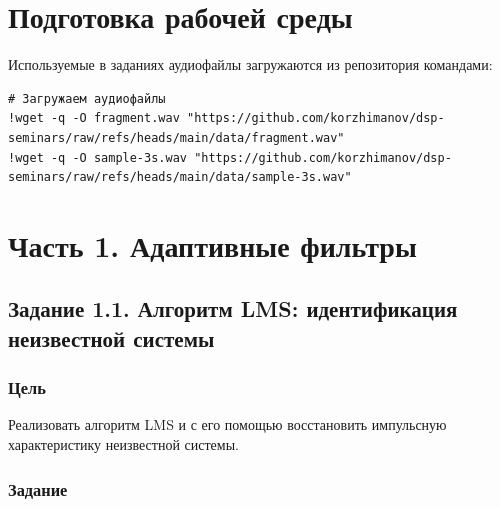 \documentclass[12pt,a4paper,openany]{book}
\begin{document}
\section*{Подготовка рабочей среды}

Используемые в заданиях аудиофайлы загружаются из репозитория командами:

\begin{Verbatim}[fontsize=\small, breaklines, breakanywhere, frame=single, framesep=2mm]
# Загружаем аудиофайлы
!wget -q -O fragment.wav "https://github.com/korzhimanov/dsp-seminars/raw/refs/heads/main/data/fragment.wav"
!wget -q -O sample-3s.wav "https://github.com/korzhimanov/dsp-seminars/raw/refs/heads/main/data/sample-3s.wav"
\end{Verbatim}

\section*{Часть 1. Адаптивные фильтры}

\subsection*{Задание 1.1. Алгоритм LMS: идентификация неизвестной системы}

\subsubsection*{Цель}

Реализовать алгоритм LMS и с его помощью восстановить импульсную характеристику неизвестной системы.

\subsubsection*{Задание}
\end{document}
